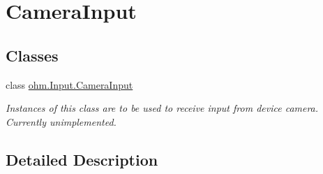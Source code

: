 \hypertarget{group___camera_input}{}\section{Camera\+Input}
\label{group___camera_input}
\subsection*{Classes}
\begin{DoxyCompactItemize}
\item 
class \hyperlink{classohm_1_1_input_1_1_camera_input}{ohm.\+Input.\+Camera\+Input}
\begin{DoxyCompactList}\small\item\em Instances of this class are to be used to receive input from device camera. Currently unimplemented. \end{DoxyCompactList}\end{DoxyCompactItemize}


\subsection{Detailed Description}
